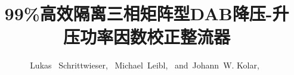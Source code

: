\documentclass[journal]{IEEEtran}
\begin{document}
%
\title{99\%高效隔离三相矩阵型DAB降压-升压功率因数校正整流器}
%
%
%

\author{Lukas ~Schrittwieser,~
Michael~Leibl,~
and~Johann~W. Kolar,~ }

%
%
%
%
%

% 
%
\end{document}
